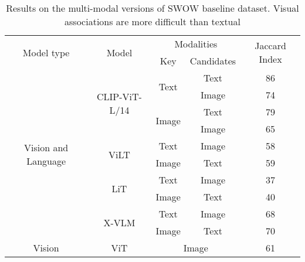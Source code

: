 \documentclass{article}
\begin{document}
\begin{table}[!htb]
\centering
\caption{Results on the multi-modal versions of SWOW baseline dataset. Visual associations are more difficult than textual}
\label{tab:table_swow_all_modalities}
\begin{tabular}{@{}ccccc@{}} \toprule
\multirow{2}{*}{Model type}          & \multirow{2}{*}{Model} & \multicolumn{2}{c}{Modalities}             & \multirow{2}{*}{Jaccard Index} \\
                                     &                        & Key                        & Candidates    &                                \\ \midrule
\multirow{10}{*}{Vision and Language} & \multirow{4}{*}{CLIP-ViT-L/14} & \multirow{2}{*}{Text}      & Text          & 86                             \\
                                      &                            &                            & Image         & 74                             \\
                                      &                            & \multirow{2}{*}{Image}     & Text          & 79                             \\
                                      &                            &                            & Image         & 65                             \\
                                      & \multirow{2}{*}{ViLT}      & Text                       & Image         & 58                             \\
                                      &                            & Image                      & Text          & 59                             \\
                                      &   \multirow{2}{*}{LiT}     & Text                       & Image         & 37                              \\
                                      &                            & Image                      & Text          & 40                              \\ 
                                      & \multirow{2}{*}{X-VLM}     & Text                       & Image         & 68                              \\
                                      &                            & Image                      & Text          & 70                              \\ \midrule
\multirow{4}{*}{Vision}              & ViT                    & \multicolumn{2}{c}{\multirow{4}{*}{Image}} & 61                             \\

\end{tabular}
\end{table}
\end{document}
